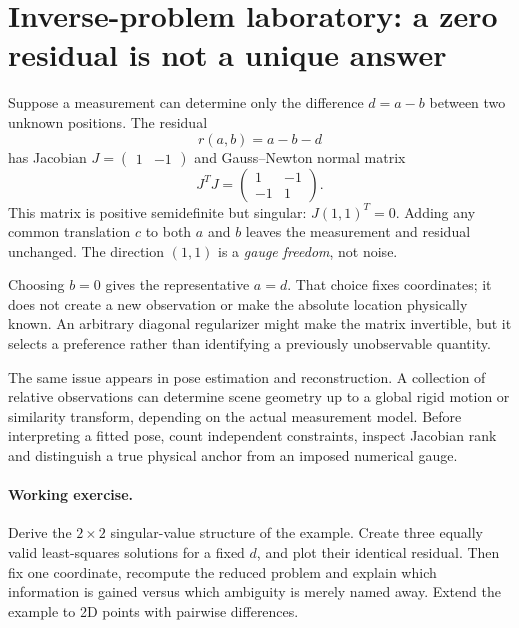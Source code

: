 \clearpage
\section*{Inverse-problem laboratory: a zero residual is not a unique answer}
\noindent Suppose a measurement can determine only the difference
\(d=a-b\) between two unknown positions. The residual
\[
r(a,b)=a-b-d
\]
has Jacobian \(J=\begin{pmatrix}1&-1\end{pmatrix}\)
and Gauss--Newton normal matrix
\[
J^TJ=\begin{pmatrix}1&-1\\-1&1\end{pmatrix}.
\]
This matrix is positive semidefinite but singular:
\(J(1,1)^T=0\). Adding any common translation \(c\) to
both \(a\) and \(b\) leaves the measurement and residual unchanged.
The direction \((1,1)\) is a \emph{gauge freedom}, not noise.

Choosing \(b=0\) gives the representative \(a=d\).
That choice fixes coordinates; it does not create a new observation
or make the absolute location physically known.
An arbitrary diagonal regularizer might make the matrix
invertible, but it selects a preference rather than identifying
a previously unobservable quantity.

The same issue appears in pose estimation and reconstruction.
A collection of relative observations can determine scene geometry
up to a global rigid motion or similarity transform, depending on
the actual measurement model. Before interpreting a fitted pose,
count independent constraints, inspect Jacobian rank and distinguish
a true physical anchor from an imposed numerical gauge.

\paragraph{Working exercise.}
Derive the \(2\times2\) singular-value structure of the example.
Create three equally valid least-squares solutions for a fixed \(d\),
and plot their identical residual. Then fix one coordinate, recompute
the reduced problem and explain which information is gained versus
which ambiguity is merely named away. Extend the example to 2D
points with pairwise differences.
